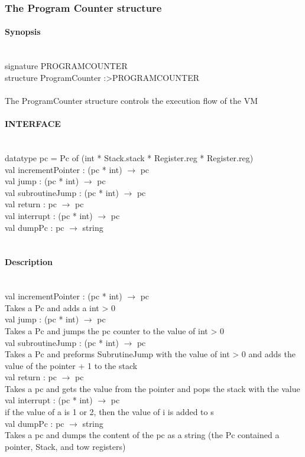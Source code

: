 \documentclass{article}
\begin{document}
\subsubsection{The Program Counter structure}
\paragraph{Synopsis} \ 
\\
signature PROGRAM\textunderscore COUNTER\\
structure ProgramCounter :\textgreater PROGRAM\textunderscore COUNTER\\
\\
The ProgramCounter structure controls the execution flow of the VM
\\
\paragraph{INTERFACE} \ 
\\
	datatype pc = Pc of (int * Stack.stack * Register.reg * Register.reg)
\\
	val incrementPointer : (pc * int) $\rightarrow$ pc\\
	val jump : (pc * int) $\rightarrow$ pc\\
	val subroutineJump : (pc * int) $\rightarrow$ pc\\ 						
	val return : pc $\rightarrow$ pc\\	
    val interrupt : (pc * int) $\rightarrow$ pc\\
    val dumpPc : pc $\rightarrow$ string\\
\\
\paragraph{Description} \ 
\\
	val incrementPointer : (pc * int) $\rightarrow$ pc\\
		Takes a Pc and adds a int > 0\\							
	val jump : (pc * int) $\rightarrow$ pc\\
		Takes a Pc and jumps the pc counter to the value of int > 0\\
	val subroutineJump : (pc * int) $\rightarrow$ pc\\
		Takes a Pc and preforms SubrutineJump with the value of  int > 0 and adds the  value of the pointer + 1 to the stack\\						
	val return : pc $\rightarrow$ pc\\
    	Takes a pc and gets the value from the pointer and pops the stack with the value\\
	val interrupt : (pc * int) $\rightarrow$ pc\\							
		if the value of a is 1 or 2, then the value of i is added to s\\
	val dumpPc : pc $\rightarrow$ string\\
		Takes a pc and dumps the content of the pc as a string (the Pc contained a pointer, Stack, and tow registers)\\
\end{document}
